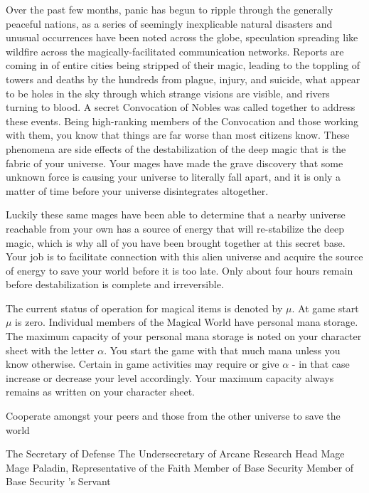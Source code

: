 \documentclass[blue]{guildcamp3}
\begin{document}
Over the past few months, panic has begun to ripple through the generally peaceful nations, as a series of seemingly inexplicable natural disasters and unusual occurrences have been noted across the globe, speculation spreading like wildfire across the magically-facilitated communication networks. Reports are coming in of entire cities being stripped of their magic, leading to the toppling of towers and deaths by the hundreds from plague, injury, and suicide, what appear to be holes in the sky through which strange visions are visible, and rivers turning to blood. A secret Convocation of Nobles was called together to address these events. Being high-ranking members of the Convocation and those working with them, you know that things are far worse than most citizens know. These phenomena are side effects of the destabilization of the deep magic that is the fabric of your universe. Your mages have made the grave discovery that some unknown force is causing your universe to literally fall apart, and it is only a matter of time before your universe disintegrates altogether.

Luckily these same mages have been able to determine that a nearby universe reachable from your own has a source of energy that will re-stabilize the deep magic, which is why all of you have been brought together at this secret base. Your job is to facilitate connection with this alien universe and acquire the source of energy to save your world before it is too late. Only about four hours remain before destabilization is complete and irreversible.

The current status of operation for magical items is denoted by $\mu$. At game start $\mu$ is zero. Individual members of the Magical World have personal mana storage. The maximum capacity of your personal mana storage is noted on your character sheet with the letter $\alpha$. You start the game with that much mana unless you know otherwise. Certain in game activities may require or give $\alpha$ - in that case increase or decrease your level accordingly. Your maximum capacity always remains as written on your character sheet. 

\begin{itemz}[Goals]
	\item Cooperate amongst your peers and those from the other universe to save the world
\end{itemz}


\begin{members}
	\member{\cNobleOne{}} The Secretary of Defense
	\member{\cNobleTwo{}} The Undersecretary of Arcane Research
	\member{\cMageOne{}} Head Mage
	\member{\cMageTwo{}} Mage
	\member{\cPaladin{}} Paladin, Representative of the Faith
	\member{\cRogueOne{}} Member of Base Security
	\member{\cRogueTwo{}} Member of Base Security
	\member{\cServant{}} \cNobleOne{}'s Servant
\end{members}
\end{document}
